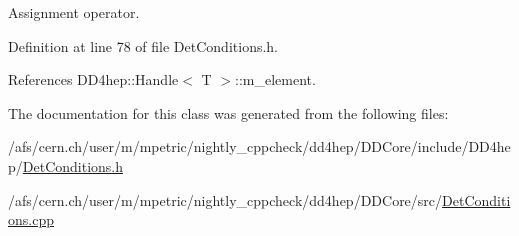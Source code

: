 Assignment operator. 



Definition at line 78 of file Det\+Conditions.\+h.



References D\+D4hep\+::\+Handle$<$ T $>$\+::m\+\_\+element.



The documentation for this class was generated from the following files\+:\begin{DoxyCompactItemize}
\item 
/afs/cern.\+ch/user/m/mpetric/nightly\+\_\+cppcheck/dd4hep/\+D\+D\+Core/include/\+D\+D4hep/\hyperlink{_det_conditions_8h}{Det\+Conditions.\+h}\item 
/afs/cern.\+ch/user/m/mpetric/nightly\+\_\+cppcheck/dd4hep/\+D\+D\+Core/src/\hyperlink{_det_conditions_8cpp}{Det\+Conditions.\+cpp}\end{DoxyCompactItemize}
